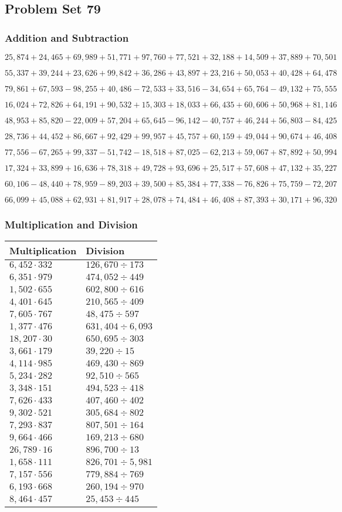 \hypertarget{problem-set-79}{%
\subsection{Problem Set 79}\label{problem-set-79}}

\hypertarget{addition-and-subtraction-301}{%
\subsubsection{Addition and
Subtraction}\label{addition-and-subtraction-301}}

\(25,874+24,465+69,989+51,771+97,760+77,521+32,188+14,509+37,889+ 70,501\)

\(55,337+39,244+23,626+99,842+36,286+43,897+23,216+50,053+40,428+64,478\)

\(79,861+67,593-98,255+40,486-72,533+33,516-34,654+65,764-49,132+75,555\)

\(16,024+72,826+64,191+90,532+15,303+18,033+66,435+60,606+50,968+81,146\)

\(48,953+85,820-22,009+57,204+65,645-96,142-40,757+46,244+56,803-84,425\)

\(28,736+44,452+86,667+92,429+99,957+45,757+60,159+49,044+90,674+46,408\)

\(77,556-67,265+99,337-51,742-18,518+87,025-62,213+59,067+87,892+50,994\)

\(17,324+33,899+16,636+78,318+49,728+93,696+25,517+57,608+47,132+35,227\)

\(60,106-48,440+78,959-89,203+39,500+85,384+77,338-76,826+75,759-72,207\)

\(66,099+45,088+62,931+81,917+28,078+74,484+46,408+87,393+30,171+96,320\)

\hypertarget{multiplication-and-division-300}{%
\subsubsection{Multiplication and
Division}\label{multiplication-and-division-300}}

\begin{longtable}[]{@{}ll@{}}
\toprule
Multiplication & Division\tabularnewline
\midrule
\endhead
\(6,452\cdot332\) & \(126,670÷173\)\tabularnewline
\(6,351\cdot979\) & \(474,052÷449\)\tabularnewline
\(1,502\cdot655\) & \(602,800÷616\)\tabularnewline
\(4,401\cdot645\) & \(210,565÷409\)\tabularnewline
\(7,605\cdot767\) & \(48,475÷597\)\tabularnewline
\(1,377\cdot476\) & \(631,404÷6,093\)\tabularnewline
\(18,207\cdot30\) & \(650,695÷303\)\tabularnewline
\(3,661\cdot179\) & \(39,220÷15\)\tabularnewline
\(4,114\cdot985\) & \(469,430÷869\)\tabularnewline
\(5,234\cdot282\) & \(92,510÷565\)\tabularnewline
\(3,348\cdot151\) & \(494,523÷418\)\tabularnewline
\(7,626\cdot433\) & \(407,460÷402\)\tabularnewline
\(9,302\cdot521\) & \(305,684÷802\)\tabularnewline
\(7,293\cdot837\) & \(807,501÷164\)\tabularnewline
\(9,664\cdot466\) & \(169,213÷680\)\tabularnewline
\(26,789\cdot16\) & \(896,700÷13\)\tabularnewline
\(1,658\cdot111\) & \(826,701÷5,981\)\tabularnewline
\(7,157\cdot556\) & \(779,884÷769\)\tabularnewline
\(6,193\cdot668\) & \(260,194÷970\)\tabularnewline
\(8,464\cdot457\) & \(25,453÷445\)\tabularnewline
\bottomrule
\end{longtable}

